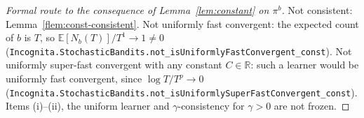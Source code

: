 \documentclass[11pt]{article}
\newcommand{\E}{\mathbb{E}}
\begin{document}
\begin{proof}[Formal route to the consequence of Lemma~\ref{lem:constant} on $\pi^b$]
Not consistent: Lemma~\ref{flem:const-consistent}. Not uniformly fast convergent: the expected
count of $b$ is $T$, so $\E[N_b(T)]/T^1\to1\ne0$ (\texttt{Incognita.StochasticBandits.not\_isUniformlyFastConvergent\_const}).
Not uniformly super-fast convergent with any constant $C\in\mathbb R$: such a learner would be
uniformly fast convergent, since $\log T/T^p\to0$
(\texttt{Incognita.StochasticBandits.not\_isUniformlySuperFastConvergent\_const}). Items (i)--(ii),
the uniform learner and $\gamma$-consistency for $\gamma>0$ are not frozen.
\end{proof}
\end{document}
